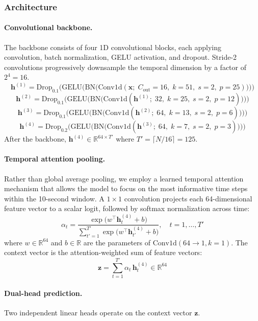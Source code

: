 \subsubsection{Architecture}

\paragraph{Convolutional backbone.}
The backbone consists of four 1D convolutional blocks, each applying convolution, batch normalization, GELU activation, and dropout. Stride-2 convolutions progressively downsample the temporal dimension by a factor of $2^4 = 16$.
\[ \mathbf{h}^{(1)} = \mathrm{Drop}_{0.1}\!\Big(\mathrm{GELU}\!\big(\mathrm{BN}\!\big(\mathrm{Conv1d}(\mathbf{x};\; C_{\mathrm{out}}{=}16,\; k{=}51,\; s{=}2,\; p{=}25)\big)\big)\Big) \tag{2} \]
\[ \mathbf{h}^{(2)} = \mathrm{Drop}_{0.1}\!\Big(\mathrm{GELU}\!\big(\mathrm{BN}\!\big(\mathrm{Conv1d}(\mathbf{h}^{(1)};\; 32,\; k{=}25,\; s{=}2,\; p{=}12)\big)\big)\Big) \tag{3} \]
\[ \mathbf{h}^{(3)} = \mathrm{Drop}_{0.1}\!\Big(\mathrm{GELU}\!\big(\mathrm{BN}\!\big(\mathrm{Conv1d}(\mathbf{h}^{(2)};\; 64,\; k{=}13,\; s{=}2,\; p{=}6)\big)\big)\Big) \tag{4} \]
\[ \mathbf{h}^{(4)} = \mathrm{Drop}_{0.2}\!\Big(\mathrm{GELU}\!\big(\mathrm{BN}\!\big(\mathrm{Conv1d}(\mathbf{h}^{(3)};\; 64,\; k{=}7,\; s{=}2,\; p{=}3)\big)\big)\Big) \tag{5} \]
After the backbone, $\mathbf{h}^{(4)} \in \mathbb{R}^{64 \times T'}$ where $T' = \lceil N / 16 \rceil = 125$.

\paragraph{Temporal attention pooling.}
Rather than global average pooling, we employ a learned temporal attention mechanism that allows the model to focus on the most informative time steps within the 10-second window. A $1 \times 1$ convolution projects each 64-dimensional feature vector to a scalar logit, followed by softmax normalization across time:
\[ \alpha_t = \frac{\exp\!\big(w^{\top} \mathbf{h}^{(4)}_t + b\big)}{\sum_{t'=1}^{T'} \exp\!\big(w^{\top} \mathbf{h}^{(4)}_{t'} + b\big)}, \quad t = 1, \ldots, T' \tag{6} \]
where $w \in \mathbb{R}^{64}$ and $b \in \mathbb{R}$ are the parameters of $\mathrm{Conv1d}(64 \to 1, k{=}1)$. The context vector is the attention-weighted sum of feature vectors:
\[ \mathbf{z} = \sum_{t=1}^{T'} \alpha_t \, \mathbf{h}^{(4)}_t \in \mathbb{R}^{64} \tag{7} \]

\paragraph{Dual-head prediction.}
Two independent linear heads operate on the context vector $\mathbf{z}$.

